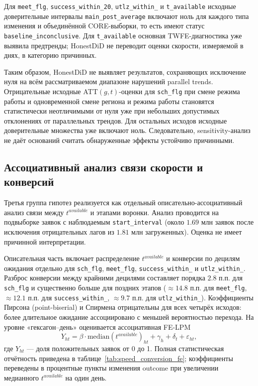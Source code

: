 \documentclass[14pt,a4paper]{extarticle}
\begin{document}
Для \texttt{meet\_flg}, \texttt{success\_within\_20}, \texttt{utlz\_\allowbreak within\_} и \texttt{t\_\allowbreak available} исходные доверительные интервалы \texttt{main\_\allowbreak post\_\allowbreak average} включают ноль для каждого типа изменения и объединённой CORE-выборки, то есть имеют статус \texttt{baseline\_\allowbreak inconclusive}. Для \texttt{t\_\allowbreak available} основная TWFE-диагностика уже выявила предтренды; HonestDiD не переводит оценки скорости, измеряемой в днях, в категорию причинных.

Таким образом, HonestDiD не выявляет результатов, сохраняющих исключение нуля на всём рассматриваемом диапазоне нарушений parallel trends. Отрицательные исходные ATT\((g,t)\)-оценки для \texttt{sch\_flg} при смене режима работы и одновременной смене региона и режима работы становятся статистически неотличимыми от нуля уже при небольших допустимых отклонениях от параллельных трендов. Для остальных исходов исходные доверительные множества уже включают ноль. Следовательно, sensitivity-анализ не даёт оснований считать обнаруженные эффекты устойчиво причинными.

\subsection{Ассоциативный анализ связи скорости и конверсий}
\label{subsec:speed_conversion_association}

Третья группа гипотез реализуется как отдельный описательно-ассоциативный анализ связи между \(t^{available}\) и этапами воронки. Анализ проводится на подвыборке заявок с наблюдаемым \texttt{start\_interval} (около \(1.69\) млн заявок после исключения отрицательных лагов из \(1.81\) млн загруженных). Оценка не имеет причинной интерпретации.

Описательная часть включает распределение \(t^{available}\) и конверсии по децилям ожидания отдельно для \texttt{sch\_\allowbreak flg}, \texttt{meet\_\allowbreak flg}, \texttt{success\_\allowbreak within\_} и \texttt{utlz\_\allowbreak within\_}. Разброс конверсии между крайними децилями составляет порядка \(2.8\) п.п. для \texttt{sch\_\allowbreak flg} и существенно больше для поздних этапов (\(\approx 14.8\) п.п. для \texttt{meet\_\allowbreak flg}, \(\approx 12.1\) п.п. для \texttt{success\_\allowbreak within\_}, \(\approx 9.7\) п.п. для \texttt{utlz\_\allowbreak within\_}).
Коэффициенты Пирсона (point-biserial) и Спирмена отрицательны для всех четырёх исходов: более длительное ожидание ассоциировано с меньшей вероятностью перехода. На уровне «гексагон--день» оценивается ассоциативная FE-LPM
\[
Y_{ht}
=
\beta \cdot \mathrm{median}(t^{available})_{ht}
+
\gamma_h
+
\delta_t
+
\varepsilon_{ht},
\]
где \(Y_{ht}\) --- доля положительных заявок от 0 до 1. Полная статистическая
отчётность приведена в таблице~\ref{tab:speed_conversion_fe}; коэффициенты
переведены в процентные пункты изменения outcome при увеличении медианного
\(t^{available}\) на один день.
\end{document}

